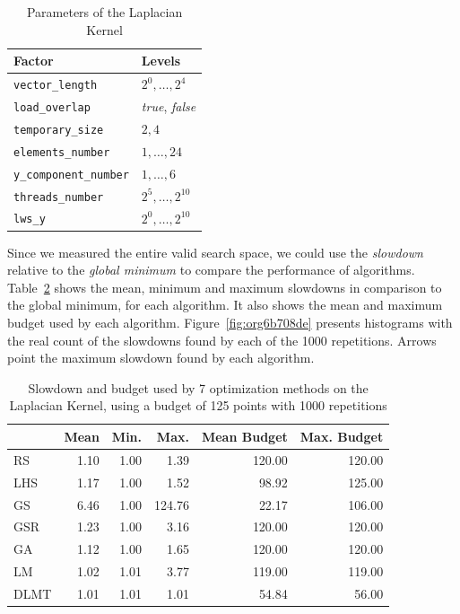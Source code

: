 \documentclass[conference]{IEEEtran}
\begin{document}
\begin{table}[t]
\caption{\label{tab:orgc525e9f}
Parameters of the Laplacian Kernel}
\centering
\scriptsize
\begin{tabular}{ll}
\toprule
Factor & Levels\\
\midrule
\texttt{vector\_length} & \(2^0,\dots,2^4\)\\
\texttt{load\_overlap} & \textit{true}, \textit{false}\\
\texttt{temporary\_size} & \(2,4\)\\
\texttt{elements\_number} & \(1,\dots,24\)\\
\texttt{y\_component\_number} & \(1,\dots,6\)\\
\texttt{threads\_number} & \(2^5,\dots,2^{10}\)\\
\texttt{lws\_y} & \(2^0,\dots,2^{10}\)\\
\bottomrule
\end{tabular}
\end{table}

Since we measured the entire valid search space, we could use the \emph{slowdown}
relative to the \emph{global minimum} to compare the performance of algorithms.
Table~\ref{tab:gpu_laplacian_compare_budget} shows the mean, minimum and
maximum slowdowns in comparison to the global minimum, for each algorithm. It
also shows the mean and maximum budget used by each algorithm.
Figure~\ref{fig:org6b708de} presents histograms with the
real count of the slowdowns found by each of the 1000 repetitions. Arrows point
the maximum slowdown found by each algorithm.

\begin{table}[ht]
\centering
\caption{Slowdown and budget used by 7 optimization methods on the Laplacian Kernel, using a budget of 125 points with 1000 repetitions}
\label{tab:gpu_laplacian_compare_budget}
\begingroup\footnotesize
\begin{tabular}{lrrrrr}
  \toprule
 & Mean & Min. & Max. & Mean Budget & Max. Budget \\
  \midrule
RS & 1.10 & 1.00 & 1.39 & 120.00 & 120.00 \\
  LHS & 1.17 & 1.00 & 1.52 & 98.92 & 125.00 \\
  GS & 6.46 & 1.00 & 124.76 & 22.17 & 106.00 \\
  GSR & 1.23 & 1.00 & 3.16 & 120.00 & 120.00 \\
  GA & 1.12 & 1.00 & 1.65 & 120.00 & 120.00 \\
  LM & 1.02 & 1.01 & 3.77 & 119.00 & 119.00 \\
   \rowcolor{red!25}DLMT & 1.01 & 1.01 & 1.01 & 54.84 & 56.00 \\
   \bottomrule
\end{tabular}
\endgroup
\end{table}
\end{document}
